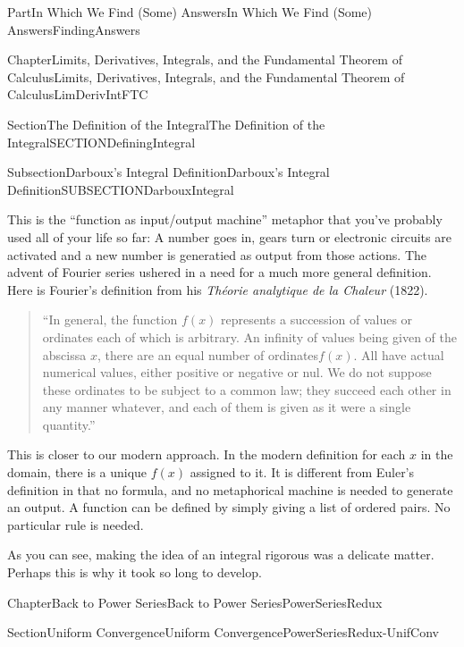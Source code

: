 \documentclass[oneside,10pt,]{book}
\newcommand{\pubtitle}[1]{\textsl{#1}}
\numberwithin{equation}{part}
\begin{document}
\begin{partptx}{Part}{In Which We Find (Some) Answers}{}{In Which We Find (Some) Answers}{}{}{FindingAnswers}
\begin{chapterptx}{Chapter}{Limits, Derivatives, Integrals, and the Fundamental Theorem of Calculus}{}{Limits, Derivatives, Integrals, and the Fundamental Theorem of Calculus}{}{}{LimDerivIntFTC}
\begin{sectionptx}{Section}{The Definition of the Integral}{}{The Definition of the Integral}{}{}{SECTIONDefiningIntegral}
\begin{subsectionptx}{Subsection}{Darboux's Integral Definition}{}{Darboux's Integral Definition}{}{}{SUBSECTIONDarbouxIntegral}
\begin{quote}
\end{quote}
This is the ``function as input\slash{}output machine'' metaphor that you've probably used all of your life so far: A number goes in, gears turn or electronic circuits are activated and a new number is generatied as output from those actions. The advent of Fourier series ushered in a need for a much more general definition. Here is Fourier's definition from his \pubtitle{\textit{Théorie analytique de la Chaleur}} (1822).%
\begin{quote}%
``In general, the function \(f(x)\) represents a succession of values or ordinates each of which is arbitrary. An infinity of values being given of the abscissa \(x\), there are an equal number of ordinates\(f(x)\). All have actual numerical values, either positive or negative or nul. We do not suppose these ordinates to be subject to a common law; they succeed each other in any manner whatever, and each of them is given as it were a single quantity.''%
\end{quote}
This is closer to our modern approach. In the modern definition for each \(x\) in the domain, there is a unique \(f(x)\) assigned to it.  It is different from Euler's definition in that no formula, and no metaphorical machine is needed to generate an output. A function can be defined by simply giving a list of ordered pairs. No particular rule is needed.%
\par
As you can see, making the idea of an integral rigorous was a delicate matter.  Perhaps this is why it took so long to develop.%
\end{subsectionptx}
\end{sectionptx}
\end{chapterptx}
%
%
\typeout{************************************************}
\typeout{************************************************}
%
\begin{chapterptx}{Chapter}{Back to Power Series}{}{Back to Power Series}{}{}{PowerSeriesRedux}
\renewcommand*{\chaptername}{Chapter}
%
%
\typeout{************************************************}
\typeout{************************************************}
%
\begin{sectionptx}{Section}{Uniform Convergence}{}{Uniform Convergence}{}{}{PowerSeriesRedux-UnifConv}

\end{sectionptx}
\end{chapterptx}
\end{partptx}
\end{document}
